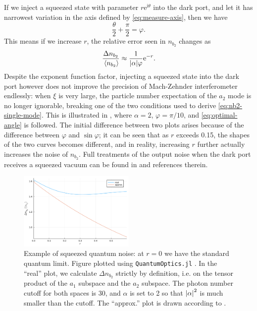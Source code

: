 \documentclass[hyperref, a4paper]{article}
\newcommand*{\ii}{\mathrm{i}}
\newcommand*{\ee}{\mathrm{e}}
\begin{document}
If we inject a squeezed state with parameter $r \ee^{\ii \theta}$ 
into the dark port,
and let it has narrowest variation in the axis defined by \eqref{eq:measure-axis}, 
then we have 
\begin{equation}
    \frac{\theta}{2} + \frac{\pi}{2} = \varphi.
    \label{eq:optimal-angle}
\end{equation}
This means if we increase $r$, 
the relative error seen in $n_{b_2}$ changes as 
\begin{equation}
    \frac{\Delta n_{b_2}}{\expval*{n_{b_2}}} \approx \frac{1}{\abs{\alpha} \varphi} \ee^{-r}.
    \label{eq:approx-squeezing}
\end{equation}
Despite the exponent function factor,
injecting a squeezed state into the dark port however does not improve 
the precision of Mach-Zehnder interferometer endlessly:
when $\xi$ is very large,
the particle number expectation of the $a_2$ mode is no longer ignorable,
breaking one of the two conditions used to derive \eqref{eq:nb2-single-mode}.
This is illustrated in ,
where $\alpha = 2$, $\varphi = \pi / 10$,
and \eqref{eq:optimal-angle} is followed.
The initial difference between two plots arises because of the difference between $\varphi$ and $\sin \varphi$;
it can be seen that as $r$ exceeds 0.15,
the shapes of the two curves becomes different,
and in reality, increasing $r$ further actually increases the noise of $n_{b_2}$.
Full treatments of the output noise when the dark port receives a squeezed vacuum
can be found in \cite{walls_quantum_2008,pezze_mach-zehnder_2008} and references therein.

\begin{figure}
    \centering
    \includegraphics[width=0.5\textwidth]{plots/squeezing-error-measure-cutoff-30-phi-pi-10-alpha-2.pdf}
    \caption{Example of squeezed quantum noise: at $r = 0$ we have the standard quantum limit.
    Figure plotted using \texttt{QuantumOptics.jl} \cite{kramer2018quantumoptics}.
    In the ``real'' plot, 
    we calculate $\Delta n_{b_2}$ strictly by definition, 
    i.e. on the tensor product of the $a_1$ subspace and the $a_2$ subspace.
    The photon number cutoff for both spaces is 30,
    and $\alpha$ is set to 2 so that $\abs{\alpha}^2$ is much smaller than the cutoff.
    The ``approx.'' plot is drawn according to .
    }
    \label{fig:squeezing}
\end{figure}
\end{document}
